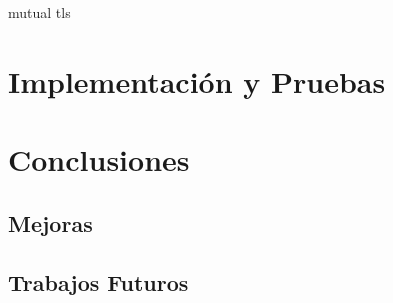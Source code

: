 \documentclass[a4paper,11pt]{book}
\begin{document}
mutual tls


\chapter{ Implementación y Pruebas}

\chapter{Conclusiones}


\section{Mejoras}

\section{Trabajos Futuros}
\end{document}

